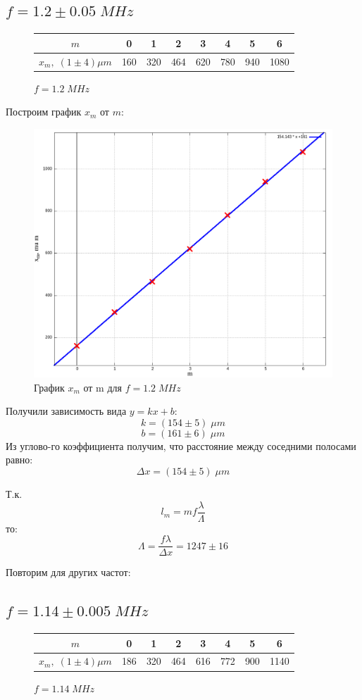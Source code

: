 \documentclass{article}
\begin{document}
\subsection*{\(f = 1.2 \pm 0.05\; MHz\)}
\begin{figure}[H]
  \centering
  \begin{tabular}{|c|c|c|c|c|c|c|c|}
    \hline
    \(m\) & 0 & 1 & 2 & 3 & 4 & 5 & 6\\\hline
    \(x_m,\; (1 \pm 4) \mu m\) & 160 & 320 & 464 & 620 & 780 & 940 & 1080\\\hline
  \end{tabular}
  \caption{\(f = 1.2\; MHz\)}
\end{figure}

Построим график \(x_m\) от \(m\):
\begin{figure}[H]
  \centering
  \includegraphics[width=\textwidth]{1200KHz.png}
  \caption{График \(x_m\) от m для \(f = 1.2\; MHz\)}
  \label{fig:1200KHz}
\end{figure}

Получили зависимость вида \(y = kx + b\):
\[ k = (154 \pm 5)\; \mu m \]
\[ b = (161 \pm 6)\; \mu m \]
Из углово-го коэффициента получим, что расстояние между соседними полосами равно:
\[ \Delta x = (154 \pm 5)\; \mu m \]

Т.к. 
\[ l_m = mf\frac{\lambda}{\Lambda} \]
то:
\[ \Lambda = \frac{f\lambda}{\Delta x} = 1247 \pm 16 \]

Повторим для других частот:

\subsection*{\(f = 1.14 \pm 0.005\; MHz\)}
\begin{figure}[H]
  \centering
  \begin{tabular}{|c|c|c|c|c|c|c|c|}
    \hline
    \(m\) & 0 & 1 & 2 & 3 & 4 & 5 & 6\\\hline
    \(x_m,\; (1 \pm 4) \mu m\) & 186 & 320 & 464 & 616 & 772 & 900 & 1140\\\hline
  \end{tabular}
  \caption{\(f = 1.14\; MHz\)}
\end{figure}
\end{document}
